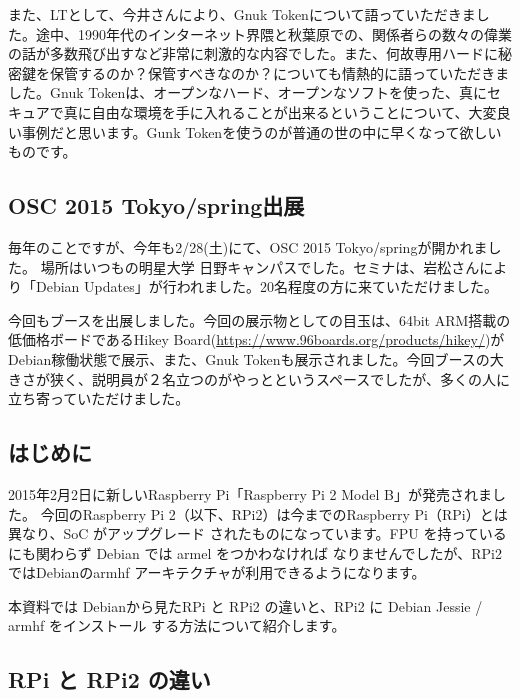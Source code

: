 \documentclass[mingoth,a4paper]{jsarticle}
\begin{document}
 また、LTとして、今井さんにより、Gnuk Tokenについて語っていただきました。途中、1990年代のインターネット界隈と秋葉原での、関係者らの数々の偉業の話が多数飛び出すなど非常に刺激的な内容でした。また、何故専用ハードに秘密鍵を保管するのか？保管すべきなのか？についても情熱的に語っていただきました。Gnuk Tokenは、オープンなハード、オープンなソフトを使った、真にセキュアで真に自由な環境を手に入れることが出来るということについて、大変良い事例だと思います。Gunk Tokenを使うのが普通の世の中に早くなって欲しいものです。

\subsection{OSC 2015 Tokyo/spring出展} 

 毎年のことですが、今年も2/28(土)にて、OSC 2015 Tokyo/springが開かれました。
 場所はいつもの明星大学 日野キャンパスでした。セミナは、岩松さんにより「Debian Updates」が行われました。20名程度の方に来ていただけました。

 今回もブースを出展しました。今回の展示物としての目玉は、64bit ARM搭載の低価格ボードであるHikey Board(\url{https://www.96boards.org/products/hikey/})がDebian稼働状態で展示、また、Gnuk Tokenも展示されました。今回ブースの大きさが狭く、説明員が２名立つのがやっとというスペースでしたが、多くの人に立ち寄っていただけました。

 

 \subsection{はじめに}

2015年2月2日に新しいRaspberry Pi「Raspberry Pi 2 Model B」が発売されました。
今回のRaspberry Pi 2（以下、RPi2）は今までのRaspberry Pi（RPi）とは異なり、SoC がアップグレード
されたものになっています。FPU を持っているにも関わらず Debian では armel をつかわなければ
なりませんでしたが、RPi2ではDebianのarmhf アーキテクチャが利用できるようになります。

本資料では Debianから見たRPi と RPi2 の違いと、RPi2 に Debian Jessie / armhf をインストール
する方法について紹介します。

\subsection{RPi と RPi2 の違い}
\end{document}
